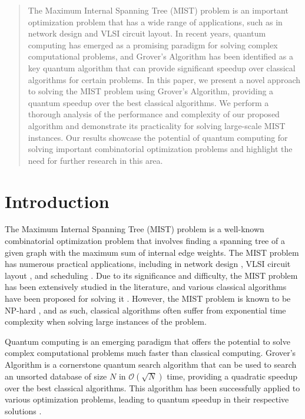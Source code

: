 \begin{abstract}
The Maximum Internal Spanning Tree (MIST) problem is an important optimization problem that has a wide range of applications, such as in network design and VLSI circuit layout. In recent years, quantum computing has emerged as a promising paradigm for solving complex computational problems, and Grover's Algorithm has been identified as a key quantum algorithm that can provide significant speedup over classical algorithms for certain problems. In this paper, we present a novel approach to solving the MIST problem using Grover's Algorithm, providing a quantum speedup over the best classical algorithms. We perform a thorough analysis of the performance and complexity of our proposed algorithm and demonstrate its practicality for solving large-scale MIST instances. Our results showcase the potential of quantum computing for solving important combinatorial optimization problems and highlight the need for further research in this area.

\end{abstract}

\section{Introduction}
The Maximum Internal Spanning Tree (MIST) problem is a well-known combinatorial optimization problem that involves finding a spanning tree of a given graph with the maximum sum of internal edge weights. The MIST problem has numerous practical applications, including in network design \cite{network}, VLSI circuit layout \cite{vlsi}, and scheduling \cite{scheduling}. Due to its significance and difficulty, the MIST problem has been extensively studied in the literature, and various classical algorithms have been proposed for solving it \cite{classical1, classical2, classical3}. However, the MIST problem is known to be NP-hard \cite{nphard}, and as such, classical algorithms often suffer from exponential time complexity when solving large instances of the problem.

Quantum computing is an emerging paradigm that offers the potential to solve complex computational problems much faster than classical computing. Grover's Algorithm \cite{grover} is a cornerstone quantum search algorithm that can be used to search an unsorted database of size $N$ in $\mathcal{O}(\sqrt{N})$ time, providing a quadratic speedup over the best classical algorithms. This algorithm has been successfully applied to various optimization problems, leading to quantum speedup in their respective solutions \cite{grovers_applications}.

